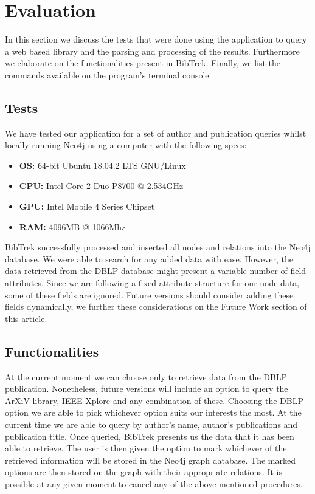 \documentclass[twocolumn]{article}
\begin{document}
\section{Evaluation}
In this section we discuss the tests that were done using the application to query a web based library and the parsing and processing of the results. Furthermore we elaborate on the functionalities present in BibTrek. Finally, we list the commands available on the program's terminal console.

\subsection{Tests}
We have tested our application for a set of author and publication queries whilst locally running Neo4j using a computer with the following specs:
\begin{itemize}
\item \textbf{OS:} 64-bit Ubuntu 18.04.2 LTS GNU/Linux 
\item \textbf{CPU:} Intel Core 2 Duo P8700 @ 2.534GHz 
\item \textbf{GPU:} Intel Mobile 4 Series Chipset
\item \textbf{RAM:} 4096MB @ 1066Mhz 
\end{itemize}
BibTrek successfully processed and inserted all nodes and relations into the Neo4j database. We were able to search for any added data with ease. However, the data retrieved from the DBLP database might present a variable number of field attributes. Since we are following a fixed attribute structure for our node data, some of these fields are ignored. Future versions should consider adding these fields dynamically, we further these considerations on the Future Work section of this article.
\subsection{Functionalities}
At the current moment we can choose only to retrieve data from the DBLP publication. Nonetheless, future versions will include an option to query the ArXiV library, IEEE Xplore and any combination of these. Choosing the DBLP option we are able to pick whichever option suits our interests the most. At the current time we are able to query by author's name, author's publications and publication title. Once queried, BibTrek presents us the data that it has been able to retrieve. The user is then given the option to mark whichever of the retrieved information will be stored in the Neo4j graph database. The marked options are then stored on the graph with their appropriate relations. It is possible at any given moment to cancel any of the above mentioned procedures.
\end{document}
